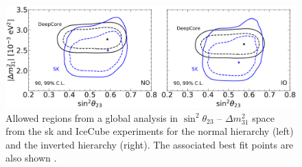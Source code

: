 \begin{figure}[h!]
    \centering
    \includegraphics[width = \hugefigwidth]{figures-chap2/theta_23_2.png}   
    \caption[Allowed regions in $\sin^2{\theta_{23}}$ -- $\Delta m^2_{31}$ space from the \gls{sk} and IceCube DeepCore experiments.]{Allowed regions from a global analysis in $\sin^2{\theta_{23}}$ -- $\Delta m^2_{31}$ space from the \gls{sk} and IceCube experiments for the normal hierarchy (left) and the inverted hierarchy (right). The associated best fit points are also shown \cite{2020_global_reassessment_of_the_neutrino_oscillation_picture}.}
    \label{fig:sk_icecube}
\end{figure}

